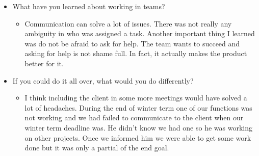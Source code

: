 \documentclass[onecolumn, draftclsnofoot,10pt, compsoc]{IEEEtran}
\begin{document}
\begin{itemize}
     \item What have you learned about working in teams?
     \begin{itemize}
         \item Communication can solve a lot of issues. There was not really any ambiguity in who was assigned a task. Another important thing I learned was do not be afraid to ask for help. The team wants to succeed and asking for help is not shame full. In fact, it actually makes the product better for it.
     \end{itemize}
     \item If you could do it all over, what would you do differently?
     \begin{itemize}
         \item I think including the client in some more meetings would have solved a lot of headaches. During the end of winter term one of our functions was not working and we had failed to communicate to the client when our winter term deadline was. He didn't know we had one so he was working on other projects. Once we informed him we were able to get some work done but it was only a partial of the end goal.
     \end{itemize}
 \end{itemize}
\end{document}
